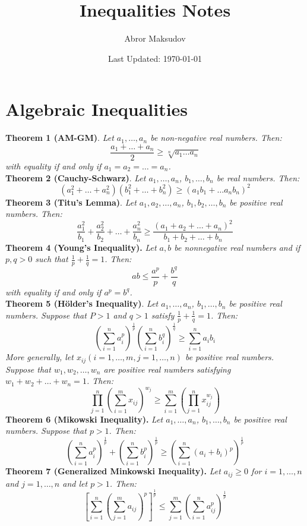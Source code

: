 \documentclass[a4paper,11pt]{article}
\title{Inequalities Notes}
\author{Abror Maksudov}
\date{Last Updated: \today}
\begin{document}
\maketitle

%
%
\section{Algebraic Inequalities}
\textbf{Theorem 1 (AM-GM)}. \textit{Let $a_1, \dots, a_n$ be non-negative real numbers. Then:}
\[
\frac{a_1 + \dots + a_n}{2} \geq \sqrt[n]{a_1 \dots a_n}
\]
\textit{with equality if and only if $a_1 = a_2 = \dots = a_n$.} \\[10pt]
%
%
\textbf{Theorem 2 (Cauchy-Schwarz)}. \textit{Let $a_1, \dots, a_n$, $b_1, \dots, b_n$ be real numbers. Then:}
\[
(a_1^2 + \dots + a_n^2)(b_1^2 + \dots + b_n^2) \geq (a_1b_1 + \dots a_nb_n)^2
\]
%
%
\textbf{Theorem 3 (Titu's Lemma)}. \textit{Let $a_1, a_2, \dots, a_n$, $b_1, b_2, \dots, b_n$ be positive real numbers. Then:}
\[
\frac{a_1^2}{b_1} + \frac{a_2^2}{b_2} + \dots + \frac{a_n^2}{b_n} \geq \frac{(a_1 + a_2 + \dots + a_n)^2}{b_1 + b_2 + \dots + b_n}  
\]
%
%
\textbf{Theorem 4 (Young's Inequality).} \textit{Let $a, b$ be nonnegative real numbers and if $p, q > 0 $ such that $\frac{1}{p} + \frac{1}{q} = 1$. Then:}
\[
ab \leq \frac{a^p}{p} + \frac{b^q}{q}
\]
\textit{with equality if and only if $a^p = b^q$.} \\[10pt]
%
%
\textbf{Theorem 5 (Hölder's Inequality)}. \textit{Let $a_1, \dots, a_n$, $b_1, \dots, b_n$ be positive real numbers. Suppose that  $P > 1$ and $q > 1$ satisfy $\frac{1}{p} + \frac{1}{q} = 1$. Then:}
\[
\left( \sum_{i=1}^n a_i^p \right) ^ \frac{1}{p} \left( \sum_{i=1}^n b_i^q \right) ^ \frac{1}{q} \geq \sum_{i=1}^n a_ib_i
\]
\textit{More generally, let $x_{ij} (i=1, \dots, m, j=1, \dots, n)$ be positive real numbers. Suppose that $w_1, w_2, \dots, w_n$ are positive real numbers satisfying $w_1 + w_2 + \dots + w_n = 1$. Then:}
\[
\prod_{j=1}^{n} \left( \sum_{i=1}^m x_{ij} \right)^{w_j} \geq \sum_{i=1}^m \left( \prod_{j=1}^n x_{ij}^{w_j} \right)
\]
%
%
\textbf{Theorem 6 (Mikowski Inequality).} \textit{Let $a_1, \dots, a_n$, $b_1, \dots, b_n$ be positive real numbers. Suppose that $p > 1$. Then:}
\[
\left( \sum_{i=1}^n a_i^p \right)^\frac{1}{p} + \left( \sum_{i=1}^n b_i^p \right)^\frac{1}{p} \geq \left( \sum_{i=1}^n (a_i + b_i)^p \right)^\frac{1}{p}
\]
%
%
\textbf{Theorem 7 (Generalized Minkowski Inequality).} \textit{Let $a_{ij} \geq 0$ for $i=1, \dots, n$ and $j=1, \dots, n$ and let $p>1$. Then:}
\[
\left[ \sum_{i=1}^n \left( \sum_{j=1}^m a_{ij} \right)^p \right]^\frac{1}{p} \leq \sum_{j=1}^m \left( \sum_{i=1}^n a_{ij}^p \right)^\frac{1}{p} 
\]
\end{document}
